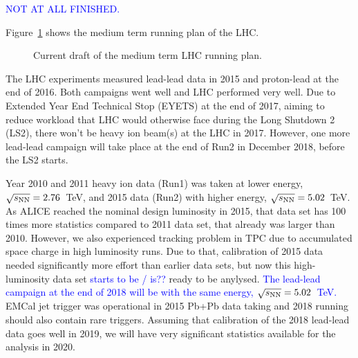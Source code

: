 \textcolor{blue}{NOT AT ALL FINISHED.}

Figure~\ref{fig:LHC-mid-term} shows the medium term running plan of the LHC. 
\begin{figure}[htbp]
   \centering
   \caption{Current draft of the medium term LHC running plan.}
   \label{fig:LHC-mid-term}
\end{figure}
The LHC experiments measured lead-lead data in 2015 and proton-lead at the end of 2016. Both campaigns went well and LHC performed very well. Due to Extended Year End Technical Stop (EYETS) at the end of 2017, aiming to reduce workload that LHC would otherwise face during the Long Shutdown 2 (LS2), there won't be heavy ion beam(s) at the LHC in 2017. However, one more lead-lead campaign will take place at the end of Run2 in December 2018, before the LS2 starts.

Year 2010 and 2011 heavy ion data (Run1) was taken at lower energy, $\sqrt{s_{\rm NN}}=2.76$~TeV, and 2015 data (Run2) with higher energy, $\sqrt{s_{\rm NN}}=5.02$~TeV. As ALICE reached the nominal design luminosity in 2015, that data set has 100 times more statistics compared to 2011 data set, that already was larger than 2010. However, we also experienced tracking problem in TPC due to accumulated space charge in high luminosity runs. Due to that, calibration of 2015 data needed significantly more effort than earlier data sets, but now this high-luminosity data set \textcolor{blue}{starts to be / is??} ready to be anylysed. \textcolor{blue}{The lead-lead campaign at the end of 2018 will be with the same energy, $\sqrt{s_{\rm NN}}=5.02$~TeV.} EMCal jet trigger was operational in 2015 Pb+Pb data taking and 2018 running should also contain rare triggers. Assuming that calibration of the 2018 lead-lead data goes well in 2019, we will have very significant statistics available for the analysis in 2020.


